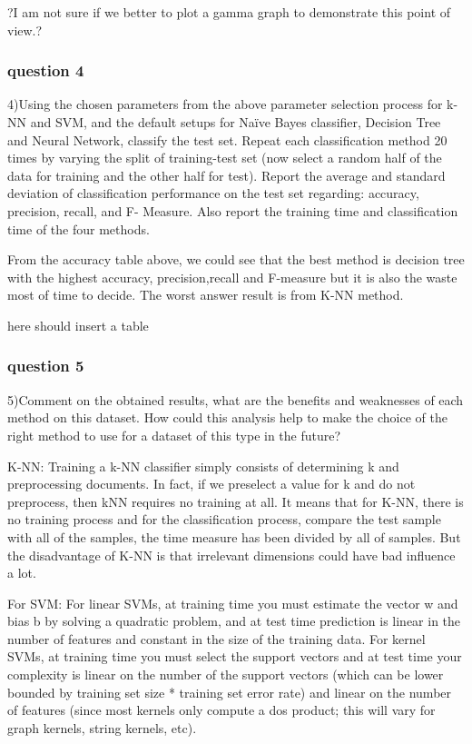 \documentclass[]{article}
\begin{document}
?I am not sure if we better to plot a gamma graph to demonstrate this point of view.?


\subsubsection{question 4}
4)Using the chosen parameters from the above parameter selection process for k-NN and SVM, and the default setups for Naïve Bayes classifier, Decision Tree and Neural Network, classify the test set. Repeat each classification method 20 times by varying the split of training-test set (now select a random half of the data for training and the other half for test). Report the average and standard deviation of classification performance on the test set regarding: accuracy, precision, recall, and F- Measure. Also report the training time and classification time of the four methods.



From the accuracy table above, we could see that the best method is decision tree with the highest accuracy, precision,recall and F-measure but it is also the waste most of time to decide. The worst answer result is from K-NN method.


here should insert a table


\subsubsection{question 5}
5)Comment on the obtained results, what are the benefits and weaknesses of each method on this dataset. How could this analysis help to make the choice of the right method to use for a dataset of this type in the future?


K-NN: Training a k-NN classifier simply consists of determining k and preprocessing documents. In fact, if we preselect a value for k and do not preprocess, then kNN requires no training at all. It means that for K-NN, there is no training process and for the classification process, compare the test sample with all of the samples, the time measure has been divided by all of samples.
But the disadvantage of K-NN is that irrelevant dimensions could have bad influence a lot.

For SVM: For linear SVMs, at training time you must estimate the vector w and bias b by solving a quadratic problem, and at test time prediction is linear in the number of features and constant in the size of the training data. For kernel SVMs, at training time you must select the support vectors and at test time your complexity is linear on the number of the support vectors (which can be lower bounded by training set size * training set error rate) and linear on the number of features (since most kernels only compute a dos product; this will vary for graph kernels, string kernels, etc).
\end{document}
